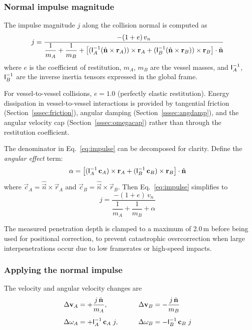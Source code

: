 \documentclass[Orbiter Technical Reference.tex]{subfiles}
\begin{document}
\subsubsection{Normal impulse magnitude}
The impulse magnitude $j$ along the collision normal is computed as
\begin{equation}
j = \frac{-(1+e)\,v_n}
     {\dfrac{1}{m_A} + \dfrac{1}{m_B}
      + \bigl[(\mathsf{I}_A^{-1}(\hat{\mathbf{n}} \times \mathbf{r}_A)) \times \mathbf{r}_A
        + (\mathsf{I}_B^{-1}(\hat{\mathbf{n}} \times \mathbf{r}_B)) \times \mathbf{r}_B\bigr]
        \cdot \hat{\mathbf{n}}}
\label{eq:impulse}
\end{equation}
where $e$ is the coefficient of restitution, $m_A$, $m_B$ are the vessel
masses, and $\mathsf{I}_A^{-1}$, $\mathsf{I}_B^{-1}$ are the inverse inertia
tensors expressed in the global frame.

For vessel-to-vessel collisions, $e = 1.0$ (perfectly elastic restitution).
Energy dissipation in vessel-to-vessel interactions is provided by
tangential friction (Section~\ref{sssec:friction}), angular damping
(Section~\ref{sssec:angdamp}), and the angular velocity cap
(Section~\ref{sssec:omegacap}) rather than through the restitution
coefficient.

The denominator in Eq.~\ref{eq:impulse} can be decomposed for clarity.
Define the \emph{angular effect} term:
\begin{equation}
\alpha = \bigl[(\mathsf{I}_A^{-1}\,\mathbf{c}_A) \times \mathbf{r}_A
         + (\mathsf{I}_B^{-1}\,\mathbf{c}_B) \times \mathbf{r}_B\bigr]
         \cdot \hat{\mathbf{n}}
\label{eq:angular_effect}
\end{equation}
where $\vec{c}_A = \hat{\vec{n}} \times \vec{r}_A$ and
$\vec{c}_B = \hat{\vec{n}} \times \vec{r}_B$.
Then Eq.~\ref{eq:impulse} simplifies to
\begin{equation}
j = \frac{-(1+e)\,v_n}{\dfrac{1}{m_A} + \dfrac{1}{m_B} + \alpha}
\label{eq:impulse_simple}
\end{equation}

The measured penetration depth is clamped to a maximum of 2.0\,m before
being used for positional correction, to prevent catastrophic
overcorrection when large interpenetrations occur due to low framerates or
high-speed impacts.

\subsubsection{Applying the normal impulse}
The velocity and angular velocity changes are
\begin{equation}
\begin{aligned}
\Delta\mathbf{v}_A &= +\frac{j\,\hat{\mathbf{n}}}{m_A}, &\qquad
\Delta\mathbf{v}_B &= -\frac{j\,\hat{\mathbf{n}}}{m_B} \\[4pt]
\Delta\mathbf{\omega}_A &= +\mathsf{I}_A^{-1}\,\mathbf{c}_A\;j, &\qquad
\Delta\mathbf{\omega}_B &= -\mathsf{I}_B^{-1}\,\mathbf{c}_B\;j
\end{aligned}
\label{eq:apply_impulse}
\end{equation}
\end{document}
